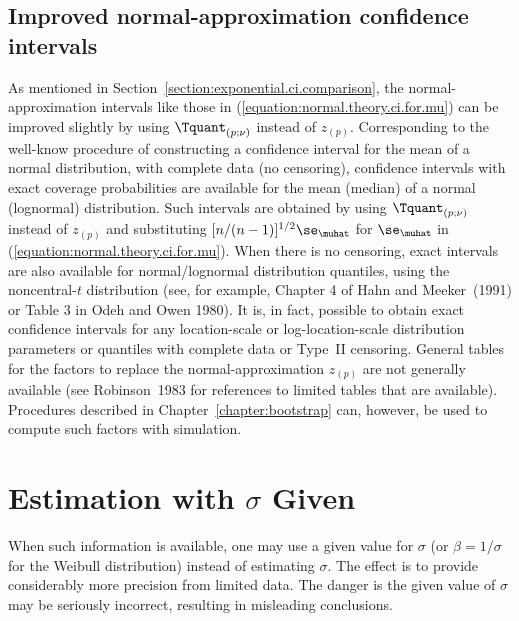 \subsection{Improved normal-approximation confidence intervals}
\label{section:improved.norm.ls}
As mentioned in Section~\ref{section:exponential.ci.comparison}, the
normal-approximation intervals like those in
(\ref{equation:normal.theory.ci.for.mu}) can be improved slightly by
using $\Tquant_{(p;\nu)}$ instead of $z_{(p)}$.  Corresponding to
the well-know procedure of constructing a confidence interval for
the mean of a normal distribution, with complete data (no
censoring), confidence intervals with exact coverage probabilities
are available for the mean (median) of a normal (lognormal)
distribution.  Such intervals are obtained by using
$\Tquant_{(p;\nu)}$ instead of $z_{(p)}$ and substituting
$[n/(n-1)]^{1/2}\se_{\muhat}$ for $\se_{\muhat}$ in
(\ref{equation:normal.theory.ci.for.mu}).  When there is no
censoring, exact intervals are also available for normal/lognormal
distribution quantiles, using the noncentral-$t$ distribution (see,
for example, Chapter 4 of Hahn and Meeker~(1991) or Table 3 in Odeh
and Owen 1980).  It is, in fact, possible to obtain exact confidence
intervals for any location-scale or log-location-scale distribution
parameters or quantiles with complete data or Type~II censoring.
General tables for the factors to replace the normal-approximation
$z_{(p)}$ are not generally available (see Robinson~1983 for
references to limited tables that are available).  Procedures
described in Chapter~\ref{chapter:bootstrap} can, however, be used
to compute such factors with simulation.


\section{Estimation with $\sigma$ Given}
\label{section:sigma.known}
When such information is available, one may use a given value for $\sigma$
(or $\beta=1/\sigma$ for the Weibull distribution) instead of
estimating $\sigma$. The
effect is to provide considerably more precision from limited
data. The danger is the given value of $\sigma$ may be seriously 
incorrect, resulting in misleading conclusions.

